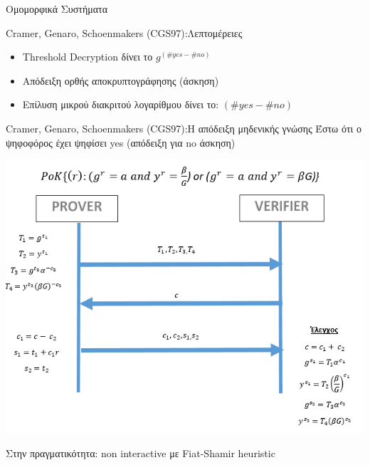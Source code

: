 \documentclass[handout]{beamer}
\begin{document}
\begin{section}{Ομομορφικά Συστήματα}
\begin{frame}{Cramer, Genaro, Schoenmakers (CGS97):Λεπτομέρειες}
\begin{itemize}
\begin{itemize}
            \item Threshold Decryption δίνει το $g^{(\#yes-\#no)}$
            \item Απόδειξη ορθής αποκρυπτογράφησης (άσκηση)
            \item Επίλυση μικρού διακριτού λογαρίθμου δίνει το:  $(\#yes-\#no)$
        \end{itemize}
    \end{itemize}
\end{frame}


\begin{frame}{Cramer, Genaro, Schoenmakers (CGS97):Η απόδειξη μηδενικής γνώσης}
    Έστω ότι ο ψηφοφόρος έχει ψηφίσει yes (απόδειξη για no άσκηση)
    \begin{center}
        \includegraphics[scale=0.4]{cgs97.PNG}
    \end{center}
    Στην πραγματικότητα: non interactive με Fiat-Shamir heuristic
\end{frame}

\end{section} 
\end{document}
